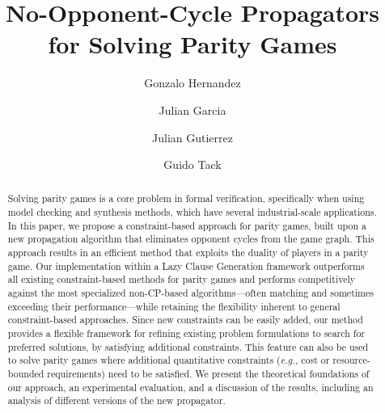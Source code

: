 \documentclass[runningheads]{llncs}
\begin{document}
%
\title{No-Opponent-Cycle Propagators \\for Solving Parity Games}

\author{
    Gonzalo Hernandez \and
    Julian Garcia \and
    Julian Gutierrez \and
    Guido Tack
}
%

%


%
\maketitle              %
%
\begin{abstract}
Solving parity games is a core problem in formal verification, specifically when using model checking and synthesis methods, which have several industrial-scale applications. In this paper, we propose a constraint-based approach for parity games, built upon a new propagation algorithm that eliminates opponent cycles from the game graph. This approach results in an efficient method that exploits the duality of players in a parity game. Our implementation within a Lazy Clause Generation framework outperforms all existing constraint-based methods for parity games and performs competitively against the most specialized non-CP-based algorithms—often matching and sometimes exceeding their performance—while retaining the flexibility inherent to general constraint-based approaches.
%
Since new constraints can be easily added, our method provides a flexible framework for refining existing problem formulations to search for preferred solutions, by satisfying additional constraints. 
%
This feature can also be used to solve parity games where additional quantitative constraints ({\em e.g.}, cost or resource-bounded requirements) need to be satisfied. 
We present the theoretical foundations of our approach, an experimental evaluation, and a discussion of the results, including an analysis of different versions of the new propagator.
\end{abstract}
%
\end{document}
